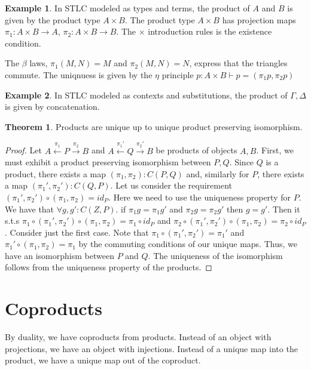 \documentclass[12pt]{article}
\theoremstyle{definition}
\newtheorem{theorem}{Theorem}[section]
\newtheorem{example}{Example}[section]
\begin{document}
\begin{example}
    In STLC modeled as types and terms, the product of $A$ and $B$ is given by the product type $A\times B$. The product type $A\times B$ has projection maps $\pi_1 : A \times B \to A$, $\pi_2 : A \times B \to B$. The $\times$ introduction rules is the existence condition. 
    \begin{prooftree}
    \end{prooftree}
    The $\beta$ laws, $\pi_1(M,N) = M$ and $\pi_2(M,N) = N$, express that the triangles commute. The uniqnuess is given by the $\eta$ principle $p : A \times B \vdash p = (\pi_1 p,\pi_2 p)$
\end{example}

\begin{example}
    In STLC modeled as contexts and substitutions, the product of $\Gamma,\Delta$ is given by concatenation.
\end{example}


\begin{theorem}
    Products are unique up to unique product preserving isomorphism.
\end{theorem}
\begin{proof}
    Let $A \xleftarrow{\pi_1} P \xrightarrow{\pi_2} B$ and $A \xleftarrow{\pi_1'} Q \xrightarrow{\pi_2'} B$ be products of objects $A,B$. First, we must exhibit a product preserving isomorphism between $P,Q$. Since $Q$ is a product, there exists a map $(\pi_1,\pi_2):C(P,Q)$ and, similarly for $P$, there exists a map $(\pi_1',\pi_2'):C(Q,P)$. Let us consider the requirement $(\pi_1',\pi_2')\circ(\pi_1,\pi_2) = id_P$. Here we need to use the uniqueness property for $P$. We have that $\forall g,g' : C(Z,P).$ if $\pi_1 g = \pi_1 g'$ and $\pi_2 g = \pi_2 g'$ then $g = g'$. Then it s.t.s $\pi_1 \circ (\pi_1',\pi_2')\circ(\pi_1,\pi_2) = \pi_1 \circ id_P$ and $\pi_2 \circ (\pi_1',\pi_2')\circ(\pi_1,\pi_2) = \pi_2 \circ id_P$. Consider just the first case. Note that $\pi_1 \circ (\pi_1',\pi_2') = \pi_1'$ and $\pi_1' \circ(\pi_1,\pi_2)=\pi_1$ by the commuting conditions of our unique maps. Thus, we have an isomorphism between $P$ and $Q$. The uniqueness of the isomorphism follows from the uniqueness property of the products.
\end{proof}

\section{Coproducts}
By duality, we have coproducts from products. Instead of an object with projections, we have an object with injections. Instead of a unique map into the product, we have a unique map out of the coproduct.
\end{document}
